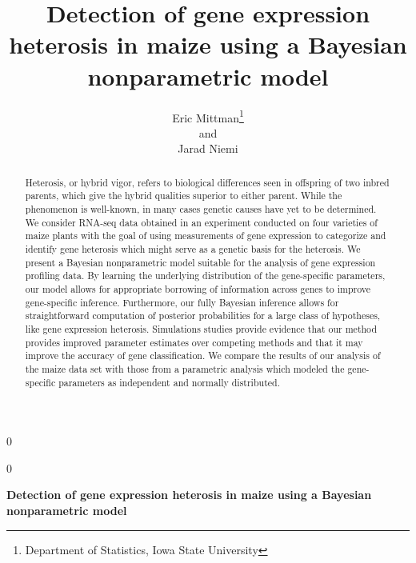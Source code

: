 \documentclass[12pt]{article}
\newcommand{\blind}{0}
\begin{document}
\newtoggle{thesis}
\toggletrue{thesis}
% 

\def\spacingset#1{\renewcommand{\baselinestretch}%
{#1}\small\normalsize} \spacingset{1}


\blind
{
  \title{\bf Detection of gene expression heterosis in maize using a Bayesian nonparametric model}
  \author{Eric Mittman\thanks{Department of Statistics, Iowa State University}\\
    and\\
    Jarad Niemi\footnotemark[1]}
  \maketitle
} \fi

\blind
{
  \bigskip
  \bigskip
  \bigskip
  \begin{center}
    {\LARGE\bf Detection of gene expression heterosis in maize using a Bayesian nonparametric model}
\end{center}
  \medskip
} \fi

\bigskip
\begin{abstract}
Heterosis, or hybrid vigor, refers to biological differences seen in offspring of two inbred parents, which give the hybrid qualities superior to either parent. While the phenomenon is well-known, in many cases genetic causes have yet to be determined. We consider RNA-seq data obtained in an experiment conducted on four varieties of maize plants with the goal of using measurements of gene expression to categorize and identify gene heterosis which might serve as a genetic basis for the heterosis. We present a Bayesian nonparametric model suitable for the analysis of gene expression profiling data. By learning the underlying distribution of the gene-specific parameters, our model allows for appropriate borrowing of information across genes to improve gene-specific inference. Furthermore, our fully Bayesian inference allows for straightforward computation of posterior probabilities for a large class of hypotheses, like gene expression heterosis. Simulations studies provide evidence that our method provides improved parameter estimates over competing methods and that it may improve the accuracy of gene classification. We compare the results of our analysis of the maize data set with those from a parametric analysis which modeled the gene-specific parameters as independent and normally distributed.

\end{abstract}
\end{document}
